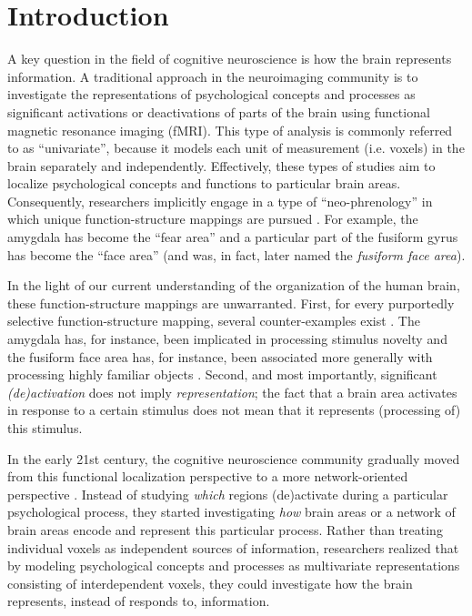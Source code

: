 \documentclass[jou,12pt,a4paper]{apa6}\usepackage[]{graphicx}\usepackage[]{color}
\begin{document}

\maketitle





\section{Introduction}
A key question in the field of cognitive neuroscience is how the brain represents information. A traditional approach in the neuroimaging community is to investigate the representations of psychological concepts and processes as significant activations or deactivations of parts of the brain using functional magnetic resonance imaging (fMRI). This type of analysis is commonly referred to as ``univariate'', because it models each unit of measurement (i.e. voxels) in the brain separately and independently. Effectively, these types of studies aim to localize psychological concepts and functions to particular brain areas. Consequently, researchers implicitly engage in a type of ``neo-phrenology'' in which unique function-structure mappings are pursued \cite{poldrack2010}. For example, the amygdala has become the ``fear area'' \cite{ledoux2003} and a particular part of the fusiform gyrus has become the ``face area'' (and was, in fact, later named the \emph{fusiform face area}).  

In the light of our current understanding of the organization of the human brain, these function-structure mappings are unwarranted. First, for every purportedly selective function-structure mapping, several counter-examples exist \cite{poldrack2010}. The amygdala has, for instance, been implicated in processing stimulus novelty \cite{blackford2010} and the fusiform face area has, for instance, been associated more generally with processing highly familiar objects \cite{tarr2000}. Second, and most importantly, significant \emph{(de)activation} does not imply \emph{representation}; the fact that a brain area activates in response to a certain stimulus does not mean that it represents (processing of) this stimulus.   

In the early 21st century, the cognitive neuroscience community gradually moved from this functional localization perspective to a more network-oriented perspective \cite{sporns2002,barrett2013}. Instead of studying \emph{which} regions (de)activate during a particular psychological process, they started investigating \emph{how} brain areas or a network of brain areas encode and represent this particular process. Rather than treating individual voxels as independent sources of information, researchers realized that by modeling psychological concepts and processes as multivariate representations consisting of interdependent voxels, they could investigate how the brain represents, instead of responds to, information.
\end{document}
